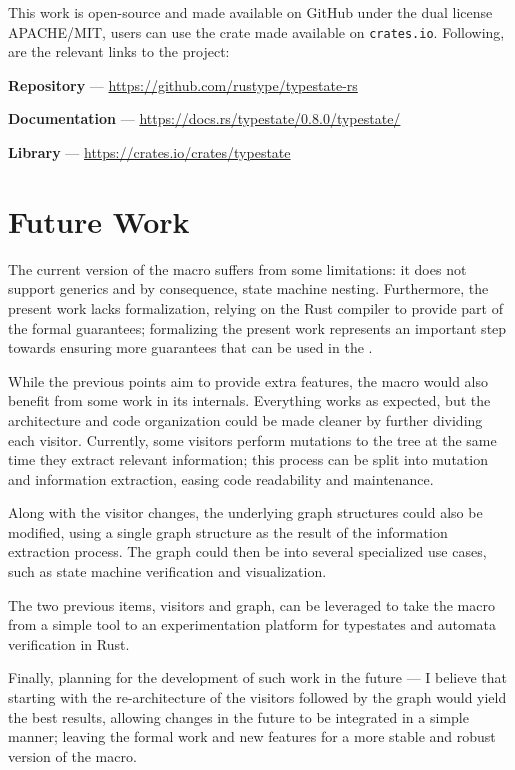 
This work is open-source and made available on GitHub under the dual license APACHE/MIT,
users can use the crate made available on \texttt{crates.io}.
Following, are the relevant links to the project:
\begin{compactitem}
    \item \textbf{Repository} --- \url{https://github.com/rustype/typestate-rs}
    \item \textbf{Documentation} --- \url{https://docs.rs/typestate/0.8.0/typestate/}
    \item \textbf{Library} --- \url{https://crates.io/crates/typestate}
\end{compactitem}

\section{Future Work}

The current version of the macro suffers from some limitations:
it does not support generics and by consequence, state machine nesting.
Furthermore, the present work lacks formalization, relying on the Rust compiler to provide part of the formal guarantees;
formalizing the present work represents an important step towards ensuring more guarantees that can be used in the .

While the previous points aim to provide extra features, the macro would also benefit from some work in its internals.
Everything works as expected, but the architecture and code organization could be made cleaner by further dividing each visitor.
Currently, some visitors perform mutations to the tree at the same time they extract relevant information;
this process can be split into mutation and information extraction, easing code readability and maintenance.

Along with the visitor changes, the underlying graph structures could also be modified,
using a single graph structure as the result of the information extraction process.
The graph could then be  into several specialized use cases, such as state machine verification and visualization.

The two previous items, visitors and graph,
can be leveraged to take the macro from a simple tool to an experimentation platform for typestates and automata verification in Rust.

Finally, planning for the development of such work in the future ---
I believe that starting with the re-architecture of the visitors followed by the graph would yield the best results,
allowing changes in the future to be integrated in a simple manner;
leaving the formal work and new features for a more stable and robust version of the macro.
